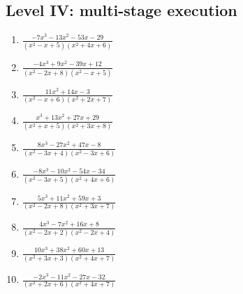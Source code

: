 \documentclass[11pt,oneside]{book}
\begin{document}
\subsection*{Level IV: multi-stage execution}
\begin{enumerate}[leftmargin=*,label=\textbf{\arabic*.},itemsep=0.65\baselineskip]
\item $\displaystyle \frac{- 7 x^{3} - 13 x^{2} - 53 x - 29}{\left(x^{2} - x + 5\right) \left(x^{2} + 4 x + 6\right)}$
\item $\displaystyle \frac{- 4 x^{3} + 9 x^{2} - 39 x + 12}{\left(x^{2} - 2 x + 8\right) \left(x^{2} - x + 5\right)}$
\item $\displaystyle \frac{11 x^{2} + 14 x - 3}{\left(x^{2} - x + 6\right) \left(x^{2} + 2 x + 7\right)}$
\item $\displaystyle \frac{x^{3} + 13 x^{2} + 27 x + 29}{\left(x^{2} + x + 5\right) \left(x^{2} + 3 x + 8\right)}$
\item $\displaystyle \frac{8 x^{3} - 27 x^{2} + 47 x - 8}{\left(x^{2} - 3 x + 4\right) \left(x^{2} - 3 x + 6\right)}$
\item $\displaystyle \frac{- 8 x^{3} - 10 x^{2} - 54 x - 34}{\left(x^{2} - 3 x + 5\right) \left(x^{2} + 4 x + 6\right)}$
\item $\displaystyle \frac{5 x^{3} + 11 x^{2} + 59 x + 3}{\left(x^{2} - 2 x + 8\right) \left(x^{2} + 3 x + 7\right)}$
\item $\displaystyle \frac{4 x^{3} - 7 x^{2} + 16 x + 8}{\left(x^{2} - 2 x + 2\right) \left(x^{2} - 2 x + 4\right)}$
\item $\displaystyle \frac{10 x^{3} + 38 x^{2} + 60 x + 13}{\left(x^{2} + 3 x + 3\right) \left(x^{2} + 4 x + 7\right)}$
\item $\displaystyle \frac{- 2 x^{3} - 11 x^{2} - 27 x - 32}{\left(x^{2} + 2 x + 6\right) \left(x^{2} + 4 x + 7\right)}$
\end{enumerate}
\end{document}
